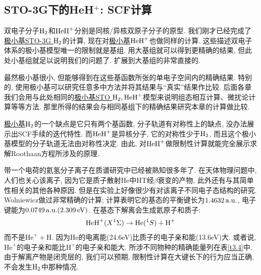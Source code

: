 \subsection{STO-3G下的HeH$^+$: SCF计算}
双电子分子$\mathrm{H}_2$和$\mathrm{HeH}^+$分别是同核/异核双原子分子的原型. 
我们刚才已经完成了\underline{极小基STO-3G $\mathrm{H}_2$}的计算, 
现在对\underline{极小基$\mathrm{HeH}^+$}也做同样的计算. 
这些描述双电子体系的极小基模型唯一的限制就是基组. 
用大基组就可以得到更精确的结果, 
但此处小基组就足以说明我们的问题了. 
扩展到大基组的非常直接的. 


最然极小基很小, 
但能够得到在这些基函数所张的单电子空间内的精确结果. 
特别的, 
使用极小基可以研究任意多中方法并将其结果与``真实''结果作比较. 
后面各章我们会用与此处相同的\underline{极小基STO $\mathrm{H}_2,\mathrm{HeH}^+$}模型来说明组态相互计算、微扰论计算等等方法. 
那里所得的结果会与相同基组下的精确结果研究本章的\hft 计算做比较.


\underline{极小基$\mathrm{H}_2$}的一个缺点是它只有两个基函数, 
分子轨道有对称性上的缺点, 没办法展示出SCF手续的迭代特性. 
而$\mathrm{HeH}^+$是异核分子, 它的对称性少于$\mathrm{H}_2$, 而且这个极小基模型的分子轨道无法由对称性决定. 
由此, 对$\mathrm{HeH}^+$做限制性\hft 计算就能完全展示求解Roothaan方程所涉及的原理. 

带一个电荷的氦氢分子离子在质谱研究中已经被熟知很多年了.
在天体物理问题中, 人们也关心该离子, 
因为它是质子散射$\mathrm{He}$中$\mathrm{HT}$经$\beta$衰变的产物,
此外还有与其简单性相关的其他各种原因. 
但是在实验上好像很少有对该离子不同电子态结构的研究.
Wolniewicz做过非常精确的计算; 计算表明它的基态的平衡键长为$1.4632\,\mathrm{a.u.}$, 电子键能为$0.0749\,\mathrm{a.u.}(2.309\,\mathrm{eV})$. 
在基态下解离会生成氦原子和质子:
\begin{align}
	\mathrm{HeH}^+(X^1\Sigma) \to \mathrm{He}(^1S) + \mathrm{H}^+
\end{align}
而不是$\mathrm{He}^+ + \mathrm{H}$. 
因为$\mathrm{He}$的电离能(24.6eV)比质子的电子亲和能(13.6eV)大. 
或者说, 
$\mathrm{He}^+$的电子亲和能比$\mathrm{H}^+$的电子亲和能大. 
所涉不同物种的精确能量列在表\ref{t3.4}中. 
由于解离产物是闭壳层的, 
我们可以预期, 
限制性\hft 计算在大键长下的行为应当正确, 
不会发生$\mathrm{H}_2$中那种情况. 

